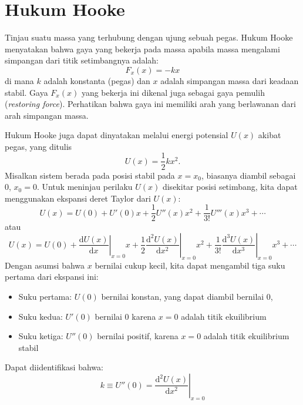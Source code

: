 \section{Hukum Hooke}

Tinjau suatu massa yang terhubung dengan ujung sebuah pegas. Hukum Hooke menyatakan
bahwa gaya yang bekerja pada massa apabila massa mengalami simpangan dari titik
setimbangnya adalah:
\begin{equation}
F_{x}(x) = -kx
\end{equation}
di mana $k$ adalah konstanta (pegas) dan $x$ adalah simpangan massa dari keadaan stabil.
Gaya $F_x(x)$ yang bekerja ini dikenal juga sebagai gaya pemulih (\textit{restoring force}).
Perhatikan bahwa gaya ini memiliki arah yang berlawanan dari arah simpangan massa.

Hukum Hooke juga dapat dinyatakan melalui energi potensial $U(x)$ akibat pegas, yang ditulis
\begin{equation}
U(x)=\frac{1}{2}kx^{2}.
\end{equation}
Misalkan sistem berada pada posisi stabil pada $x = x_{0}$, biasanya
diambil sebagai 0, $x_{0} = 0$.
Untuk meninjau perilaku $U(x)$ disekitar posisi setimbang, kita dapat menggunakan ekspansi deret
Taylor dari $U(x)$:
\begin{equation}
U(x) = U(0) + U'(0)x + \frac{1}{2}U''(x)x^{2} + \frac{1}{3!}U'''(x)x^{3} + \cdots
\end{equation}
atau
$$
U(x) = U(0) + \left. \frac{\mathrm{d}U(x)}{\mathrm{d}x}\right |_{x=0} x +
\frac{1}{2} \left. \frac{\mathrm{d}^{2}U(x)}{\mathrm{d}x^{2}}\right |_{x=0} x^{2} +
\frac{1}{3!} \left. \frac{\mathrm{d}^{3}U(x)}{\mathrm{d}x^{3}}\right |_{x=0} x^{3} + \cdots
$$
Dengan asumsi bahwa  $x$ bernilai cukup kecil, kita dapat mengambil tiga suku pertama
dari ekspansi ini:
\begin{itemize}
\item Suku pertama: $U(0)$ bernilai konstan, yang dapat diambil bernilai 0,
\item Suku kedua: $U'(0)$ bernilai 0 karena $x = 0$ adalah titik ekuilibrium
\item Suku ketiga: $U''(0)$ bernilai positif, karena $x = 0$ adalah titik ekuilibrium stabil
\end{itemize}
Dapat diidentifikasi bahwa:
\begin{equation}
k \equiv U''(0) = \left. \frac{\mathrm{d}^{2}U(x)}{\mathrm{d}x^{2}} \right|_{x=0}
\end{equation}

